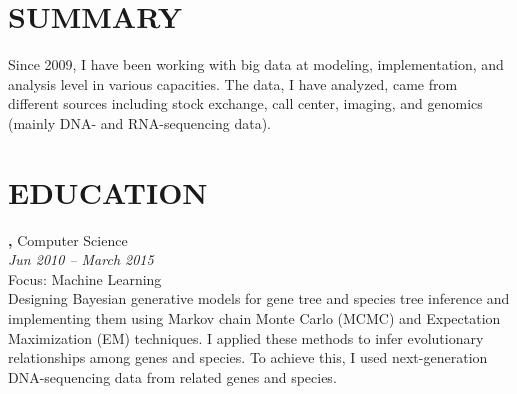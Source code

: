 \documentclass[margin, 10pt]{res} %
\begin{document}
\begin{resume}

 
\section{SUMMARY}
Since 2009, I have been working with big data at modeling, implementation, and analysis level in various capacities. The data, I have analyzed, came from different sources including stock exchange, call center, imaging, and genomics (mainly DNA- and RNA-sequencing data).




\section{EDUCATION}

{\bf \color{Black}{Doctor of Philosophy},} Computer Science \\
{} \hfill \textit{Jun 2010 -- March 2015} \\
Focus: Machine Learning \\
Designing Bayesian generative models for gene tree and species tree inference and implementing them using Markov chain Monte Carlo (MCMC) and Expectation Maximization (EM) techniques. I applied these methods to infer evolutionary relationships among genes and species. To achieve this, I used next-generation DNA-sequencing data from related genes and species.


\end{resume}
\end{document}
